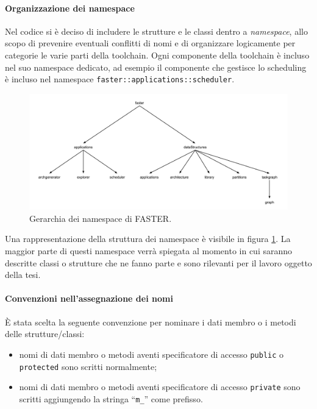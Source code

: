 \paragraph{Organizzazione dei namespace}
Nel codice si è deciso di includere le strutture e le classi dentro a 
\emph{namespace}, allo scopo di prevenire eventuali conflitti di nomi e di 
organizzare logicamente per categorie le varie parti della toolchain. Ogni componente
della toolchain è incluso nel suo namespace dedicato, ad esempio il componente che
gestisce lo scheduling è incluso nel namespace \verb+faster::applications::scheduler+.

\begin{figure}
 \begin{center}
\includegraphics[width=\textwidth]{capitoli/figure/cap4/FASTERNamespaces.pdf}
\caption{Gerarchia dei namespace di \acs{FASTER}.}
\label{fig:gerarchiaNamespace}
 \end{center}
\end{figure}

Una rappresentazione della struttura dei namespace è visibile in figura 
\ref{fig:gerarchiaNamespace}. La maggior parte di questi namespace verrà 
spiegata al momento in cui saranno descritte classi o strutture che ne fanno parte 
e sono rilevanti per il lavoro oggetto della tesi.

\paragraph{Convenzioni nell'assegnazione dei nomi}
È stata scelta la seguente convenzione per nominare i dati membro o i metodi 
delle strutture/classi:
\begin{itemize}
 \item nomi di dati membro o metodi aventi specificatore di accesso 
\verb+public+ o \verb+protected+ sono scritti normalmente;
 \item nomi di dati membro o metodi aventi specificatore di accesso 
\verb+private+ sono scritti aggiungendo la stringa ``\verb+m_+'' come prefisso.
\end{itemize}

